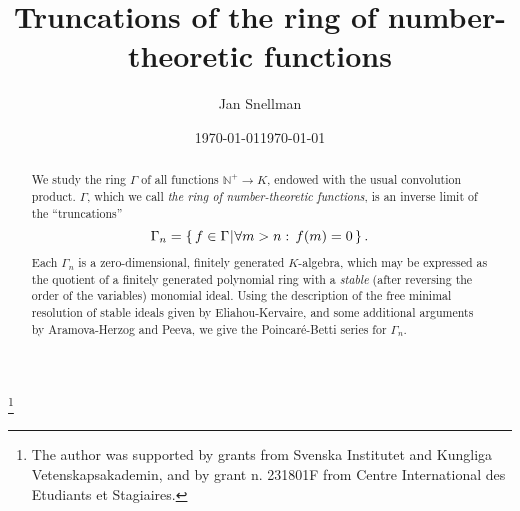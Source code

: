\documentclass[reqno,10pt]{amsart}
\theoremstyle{definition}
\theoremstyle{remark}
\theoremstyle{plain}
\newcommand{\Nat}{{\mathbb{N}}}
\def\setsuchas#1#2{\left\{\,{#1}\,\vrule\,{#2}\,\right\}}
\begin{document}
\date{\today}
\title{Truncations of the ring of 
  number-theoretic functions} 
\author{Jan Snellman}

\date{\today}
\address{School of Informatics\\ 
  University of Wales\\
  Dean Street, Bangor \\
  Gwynedd LL57 1UT\\
  Wales\\
  UK
}

\thanks{The author was supported by grants from Svenska Institutet and
  Kungliga Vetenskapsakademin, 
  and by grant n. 231801F from Centre International des Etudiants et
  Stagiaires.} 




\begin{abstract}
  We study  the ring \(\Gamma\) of all
  functions \(\Nat^+ \to K\), endowed with the usual convolution
  product.  \(\Gamma\), which we call \emph{the ring of
  number-theoretic functions},  is an inverse limit of the
  ``truncations''  
  \[\Gamma_n =  \setsuchas{f \in \Gamma}{\forall m 
    > n: \, f(m)=0}.\]
  Each \(\Gamma_n\) is a zero-dimensional,
  finitely generated \(K\)-algebra, which may be expressed as the
  quotient of a finitely generated polynomial ring with a
  \emph{stable} (after reversing the order of the variables) monomial
  ideal. Using the description of the 
  free minimal resolution 
  of stable ideals given by Eliahou-Kervaire, and some additional
  arguments by Aramova-Herzog and Peeva, we give the
  Poincar\'e-Betti  series for \(\Gamma_n\).
\end{abstract}

\maketitle
\end{document}
